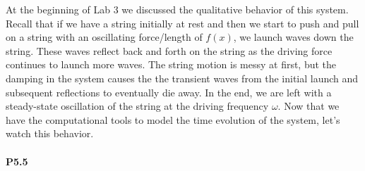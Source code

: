 \documentclass{book}
\theoremstyle{plain}
\theoremstyle{definition}
\numberwithin{exm}{chapter}
\theoremstyle{remark}
\theoremstyle{summary}
\theoremstyle{overview}
\begin{document}
At the beginning of Lab 3 we discussed the qualitative behavior of this system.
Recall that if we have a string initially at rest and then we start to push and pull on
a string with an oscillating force/length of $f(x)$, we launch waves down the string.
These waves reflect back and forth on the string as the driving force continues
to launch more waves. The string motion is messy at first, but the damping in
the system causes the the transient waves from the initial launch and subsequent
reflections to eventually die away. In the end, we are left with a steady-state
oscillation of the string at the driving frequency $\omega$.
Now that we have the computational tools to model the time evolution of the
system, let\rq s watch this behavior.
\paragraph*{P5.5}
\end{document}

